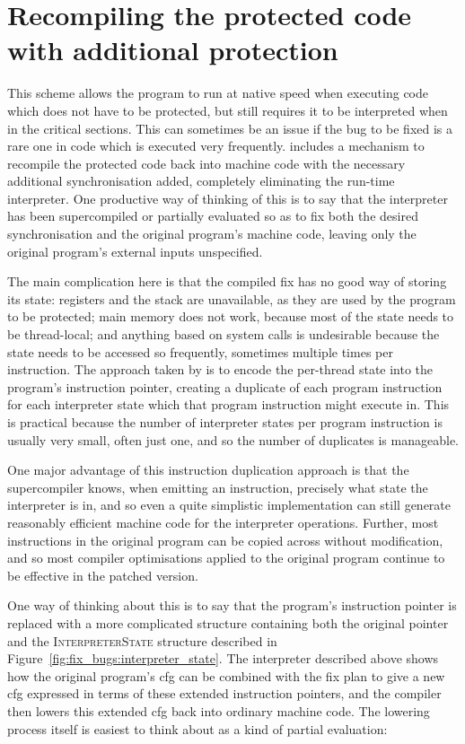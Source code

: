 \section{Recompiling the protected code with additional protection}

This scheme allows the program to run at native speed when executing
code which does not have to be protected, but still requires it to be
interpreted when in the critical sections.  This can sometimes be an
issue if the bug to be fixed is a rare one in code which is executed
very frequently.  {\Implementation} includes a mechanism to recompile
the protected code back into machine code with the necessary
additional synchronisation added, completely eliminating the run-time
interpreter.  One productive way of thinking of this is to say that
the interpreter has been supercompiled\cite{Sorensen2008} or partially
evaluated\cite{Jones1993} so as to fix both the desired
synchronisation and the original program's machine code, leaving only
the original program's external inputs unspecified.

The main complication here is that the compiled fix has no good way of
storing its state: registers and the stack are unavailable, as they
are used by the program to be protected; main memory does not work,
because most of the state needs to be thread-local; and anything based
on system calls is undesirable because the state needs to be accessed
so frequently, sometimes multiple times per instruction.  The approach
taken by {\implementation} is to encode the per-thread state into the
program's instruction pointer, creating a duplicate of each program
instruction for each interpreter state which that program instruction
might execute in.  This is practical because the number of interpreter
states per program instruction is usually very small, often just one,
and so the number of duplicates is manageable.

One major advantage of this instruction duplication approach is that
the supercompiler knows, when emitting an instruction, precisely what
state the interpreter is in, and so even a quite simplistic
implementation can still generate reasonably efficient machine code
for the interpreter operations.  Further, most instructions in the
original program can be copied across without modification, and so
most compiler optimisations applied to the original program continue
to be effective in the patched version.

One way of thinking about this is to say that the program's
instruction pointer is replaced with a more complicated structure
containing both the original pointer and the \textsc{InterpreterState}
structure described in Figure~\ref{fig:fix_bugs:interpreter_state}.
The interpreter described above shows how the original program's \gls{cfg}
can be combined with the fix plan to give a new \gls{cfg} expressed in terms
of these extended instruction pointers, and the compiler then lowers
this extended \gls{cfg} back into ordinary machine code.  The lowering
process itself is easiest to think about as a kind of partial
evaluation:

